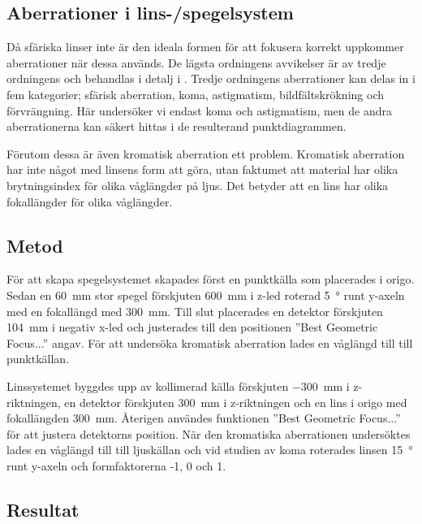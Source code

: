 \documentclass[a4paper]{article}
\begin{document}

\subsection{Aberrationer i lins-/spegelsystem}

Då sfäriska linser inte är den ideala formen för att fokusera korrekt uppkommer aberrationer när dessa används. De lägsta ordningens avvikelser är av tredje ordningens och behandlas i detalj i \cite[Kapitel~20]{pearsonIntroOpt}. Tredje ordningens aberrationer kan delas in i fem kategorier; sfärisk aberration, koma, astigmatism, bildfältskrökning och förvrängning. Här undersöker vi endast koma och astigmatism, men de andra aberrationerna kan säkert hittas i de resulterand punktdiagrammen.

Förutom dessa är även kromatisk aberration ett problem. Kromatisk aberration har inte något med linsens form att göra, utan faktumet att material har olika brytningsindex för olika våglängder på ljus. Det betyder att en lins har olika fokallängder för olika våglängder.

\subsection{Metod}

För att skapa spegelsystemet skapades först en punktkälla som placerades i origo. Sedan en \SI{60}{\milli\meter} stor spegel förskjuten \SI{600}{\milli\meter} i z-led roterad \SI{5}{\degree} runt y-axeln med en fokallängd med \SI{300}{\milli\meter}. Till slut placerades en detektor förskjuten \SI{104}{\milli\meter} i negativ x-led och justerades till den positionen ”Best Geometric Focus...” angav. För att undersöka kromatisk aberration lades en våglängd till till punktkällan.

Linssystemet byggdes upp av kollimerad källa förskjuten \SI{-300}{\milli\meter} i z-riktningen, en detektor förskjuten \SI{300}{\milli\meter} i z-riktningen och en lins i origo med fokallängden \SI{300}{\milli\meter}. Återigen användes funktionen ”Best Geometric Focus...” för att justera detektorns position. När den kromatiska aberrationen undersöktes lades en våglängd till till ljuskällan och vid studien av koma roterades linsen \SI{15}{\degree} runt y-axeln och formfaktorerna -1, 0 och 1.

\subsection{Resultat}
\end{document}
